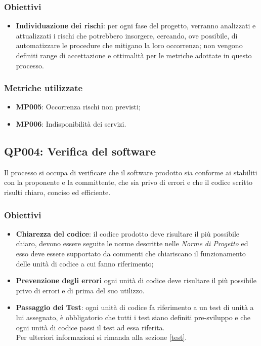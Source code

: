 \subsubsection{Obiettivi}
\begin{itemize}
	\item \textbf{Individuazione dei rischi}: per ogni fase del progetto, verranno analizzati e attualizzati i rischi che potrebbero insorgere, cercando, ove possibile, di automatizzare le procedure che mitigano la loro occorrenza; non vengono definiti range di accettazione e ottimalità per le metriche adottate in questo processo.
\end{itemize}

\subsubsection{Metriche utilizzate}
\begin{itemize}	
	\item \textbf{MP005}: Occorrenza rischi non previsti;
	\item \textbf{MP006}: Indisponibilità dei servizi.
\end{itemize}
\subsection{QP004: Verifica del software}
Il processo si occupa di verificare che il software prodotto sia conforme ai  stabiliti con la proponente e la committente, che sia privo di errori e che il codice scritto risulti chiaro, conciso ed efficiente.
\subsubsection{Obiettivi}
\begin{itemize}
	\item \textbf{Chiarezza del codice}: il codice prodotto deve risultare il più possibile chiaro, devono essere seguite le norme descritte nelle \textit{Norme di Progetto} ed esso deve essere supportato da commenti che chiariscano il funzionamento delle unità di codice a cui fanno riferimento;
	\item \textbf{Prevenzione degli errori} ogni unità di codice deve risultare il più possibile privo di errori e di  prima del suo utilizzo.
	\item \textbf{Passaggio dei Test}: ogni unità di codice fa riferimento a un test di unità a lui assegnato, è obbligatorio che tutti i test siano definiti pre-sviluppo e che ogni unità di codice passi il test ad essa riferita.\\
	Per ulteriori informazioni si rimanda alla sezione \ref{test}.
\end{itemize}
